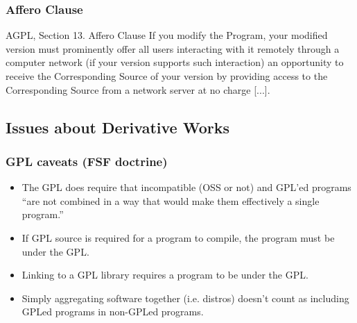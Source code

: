 \documentclass{beamer}
\begin{document}

\begin{frame}
\frametitle{Affero Clause}

\begin{block}{AGPL, Section 13. Affero Clause}
If you \alert{modify} the Program, \alert{your modified version must prominently offer all users interacting with it remotely through a computer network} (if your version supports such interaction) an opportunity to receive the Corresponding Source of your version by providing access to the Corresponding Source from a network server at no charge [...].
 \end{block}


\end{frame}

\subsection{Issues about Derivative Works}

\begin{frame}
\frametitle{GPL caveats (FSF doctrine)}

\begin{itemize}
\item The GPL does require that incompatible (OSS or not) and GPL'ed programs ``are not combined in a way that would make them effectively a single program.''
\item If GPL source is required for a program to compile, the program must be under the GPL. 
\item \alert{Linking} to a GPL library requires a program to be under the GPL.
\item Simply \alert{aggregating software} together (i.e. distros) \alert{doesn't count} as including GPLed programs in non-GPLed programs.
\end{itemize}
\end{frame}

\end{document}
